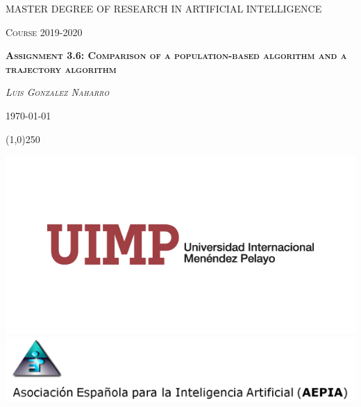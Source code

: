 \documentclass{article}[12pt]
\begin{document}
	\begin{titlepage}
		\centering
		{\scshape\huge MASTER DEGREE OF RESEARCH IN ARTIFICIAL INTELLIGENCE \par}
		\vspace{1cm}
		{\scshape\large Course 2019-2020 \par}
		\vspace{1cm}
		{\scshape\huge \bf{Assignment 3.6: Comparison of a population-based algorithm and a trajectory algorithm} \par}
		\vspace{1cm}
		{\scshape\LARGE \it{Luis Gonzalez Naharro} \par}
		\vspace{1cm}
		{\scshape\large \today \par}
		\vspace{1cm}
		{\scshape\large \line(1,0){250} \par}
		\vspace{.2cm}
		\includegraphics[width=.8\linewidth]{UIMP}
		\includegraphics[width=.8\linewidth]{AEPIA}
	\end{titlepage}
	
	\tableofcontents
	
	\newpage
	
	\listoffigures
	
	\newpage
	
	\listofalgorithms
	
	\newpage
	
	\listoftables
	
	\newpage
	
\end{document}
